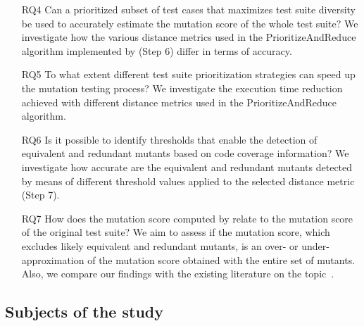 \begin{itemize}
    
    \item[RQ4] Can a prioritized subset of test cases that maximizes test suite diversity be used to accurately estimate the mutation score of the whole test suite?
    We investigate how the various distance metrics used in the PrioritizeAndReduce algorithm implemented by \APPR  (Step 6) differ in terms of accuracy. 
    

    \item[RQ5] To what extent different test suite prioritization strategies can speed up the mutation testing process? We investigate the execution time reduction achieved with different distance metrics used in the PrioritizeAndReduce algorithm. 
    

    \item[RQ6] Is it possible to identify thresholds that enable the detection of equivalent and redundant mutants based on code coverage information? We investigate how accurate are the equivalent and redundant mutants detected by means of different threshold values applied to the selected distance metric  (\APPR  Step 7).
    

    \item[RQ7] How does the mutation score computed by \APPR relate to the mutation score of the original test suite? We aim to assess if the \APPR mutation score, which excludes likely equivalent and redundant mutants, is an over- or under-approximation of the mutation score obtained with the entire set of mutants. Also, we compare our findings with the existing literature on the topic~\cite{grun2009impact,Kurtz2016}.

    
    
    
\end{itemize}



\subsection{Subjects of the study}
\label{sec:empirical:subjects}

